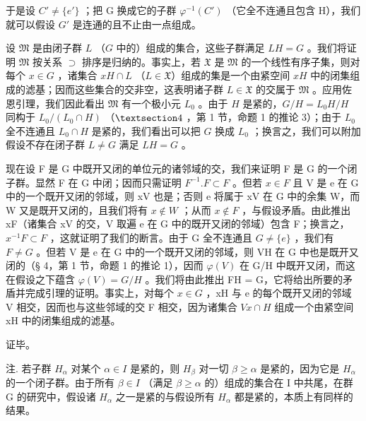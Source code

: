 于是设 \(C' \neq \{e'\}\) ；把 G 换成它的子群 \(\varphi^{-1}(C')\) （它全不连通且包含 H），我们就可以假设 \(G'\) 是连通的且不止由一点组成。

设 \(\mathfrak{M}\) 是由闭子群 \(L\) （\(G\) 中的）组成的集合，这些子群满足 \(LH = G\) 。我们将证明 \(\mathfrak{M}\) 按关系 \(\supset\) 排序是归纳的。事实上，若 \(\mathfrak{X}\) 是 \(\mathfrak{M}\) 的一个线性有序子集，则对每个 \(x \in G\) ，诸集合 \(xH \cap L\) （\(L \in \mathfrak{X}\)）组成的集是一个由紧空间 \(xH\) 中的闭集组成的滤基；因而这些集合的交非空，这表明诸子群 \(L \in \mathfrak{X}\) 的交属于 \(\mathfrak{M}\) 。应用佐恩引理，我们因此看出 \(\mathfrak{M}\) 有一个极小元 \(L_0\) 。由于 \(H\) 是紧的，\(G/H = L_0H/H\) 同构于 \(L_0/(L_0 \cap H)\) （\(\S 4\) ，第 1 节，命题 1 的推论 3）；由于 \(L_0\) 全不连通且 \(L_0 \cap H\) 是紧的，我们看出可以把 \(G\) 换成 \(L_0\) ；换言之，我们可以附加假设不存在闭子群 \(L \neq G\) 满足 \(LH = G\) 。

现在设 F 是 G 中既开又闭的单位元的诸邻域的交，我们来证明 F 是 G 的一个闭子群。显然 F 在 G 中闭；因而只需证明 \(F^{-1}.F \subset F\) 。但若 \(x \in F\) 且 V 是 e 在 G 中的一个既开又闭的邻域，则 xV 也是；否则 e 将属于 xV 在 G 中的余集 W，而 W 又是既开又闭的，且我们将有 \(x \notin W\) ；从而 \(x \notin F\) ，与假设矛盾。由此推出 xF（诸集合 xV 的交，V 取遍 e 在 G 中的既开又闭的邻域）包含 F；换言之，\(x^{-1}F \subset F\) ，这就证明了我们的断言。由于 G 全不连通且 \(G \neq \{e\}\) ，我们有 \(F \neq G\) 。但若 V 是 e 在 G 中的一个既开又闭的邻域，则 VH 在 G 中也是既开又闭的（§ 4，第 1 节，命题 1 的推论 1），因而 \(\varphi(V)\) 在 G/H 中既开又闭，而这在假设之下蕴含 \(\varphi(V) = G/H\) 。我们将由此推出 FH = G，它将给出所要的矛盾并完成引理的证明。事实上，对每个 \(x \in G\) ，xH 与 e 的每个既开又闭的邻域 V 相交，因而也与这些邻域的交 F 相交，因为诸集合 \(Vx \cap H\) 组成一个由紧空间 xH 中的闭集组成的滤基。

证毕。

注. 若子群 \(H_{\alpha}\) 对某个 \(\alpha \in I\) 是紧的，则 \(H_{\beta}\) 对一切 \(\beta \geqslant \alpha\) 是紧的，因为它是 \(H_{\alpha}\) 的一个闭子群。由于所有 \(\beta \in I\) （满足 \(\beta \geqslant \alpha\) 的）组成的集合在 I 中共尾，在群 G 的研究中，假设诸 \(H_{\alpha}\) 之一是紧的与假设所有 \(H_{\alpha}\) 都是紧的，本质上有同样的结果。

